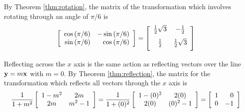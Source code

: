 \begin{solution}
By Theorem \ref{thm:rotation}, the matrix of the transformation which
involves rotating through an angle of $\pi /6$ is
\begin{equation*}
\leftB
\begin{array}{rr}
\cos \left( \pi /6\right) & -\sin \left( \pi /6\right) \\
\sin \left( \pi /6\right) & \cos \left( \pi /6\right)
\end{array}
\rightB =\leftB
\begin{array}{cc}
\vspace{0.05in}\frac{1}{2}\sqrt{3} & -\vspace{0.05in}\frac{1}{2} \\
\vspace{0.05in}\frac{1}{2} & \vspace{0.05in}\frac{1}{2}\sqrt{3}
\end{array}
\rightB
\end{equation*}

Reflecting across the $x$ axis is the same action as reflecting vectors over the line ${\bf y}=m{\bf x}$ with $m=0$. By Theorem \ref{thm:reflection}, the matrix for the transformation which reflects all vectors through the $x$
axis is
\begin{equation*}
\frac{1}{1+m^2}
\left[
\begin{array}{cc}
1-m^2 & 2m \\
2m & m^2-1 
\end{array}
\right]
=
\frac{1}{1+(0)^2}
\left[
\begin{array}{cc}
1-(0)^2 & 2(0) \\
2(0) & (0)^2-1 
\end{array}
\right]
=
\left[
\begin{array}{rr}
1 & 0 \\
0 & -1
\end{array}
\right] 
\end{equation*}


\end{solution}
